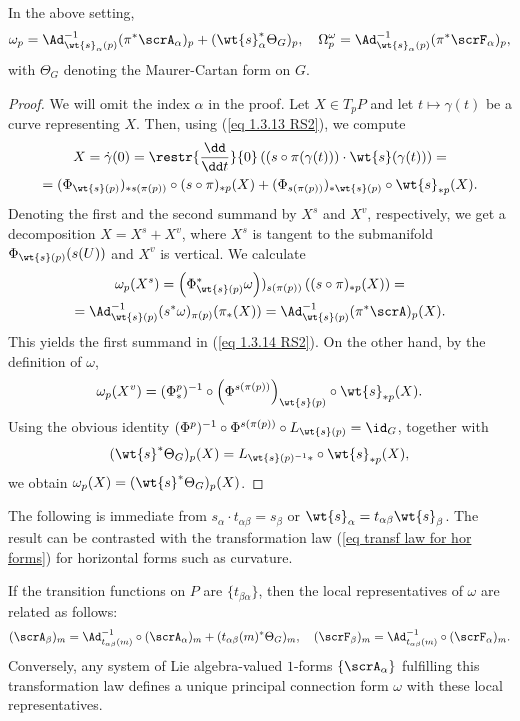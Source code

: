 \begin{prop}[{{\cite[Prop.~1.3.11]{RS2}}}]
    In the above setting, 
    \[\omega_p=\Ad_{\wt{s}_\alpha(p)}^{-1}(\pi^\ast\scrA_\alpha)_p+(\wt{s}_\alpha^\ast \Theta_G)_p,\quad \Omega^\omega_p=\Ad_{\wt{s}_\alpha(p)}^{-1}(\pi^\ast \scrF_\alpha)_p, \label{eq 1.3.14 RS2}\]
    with $\Theta_G$ denoting the Maurer-Cartan form on $G$.
\end{prop}
\begin{proof}
    We will omit the index $\alpha$ in the proof. Let $X\in T_pP$ and let $t\mapsto \gamma(t)$ be a curve representing $X$. Then, using (\ref{eq 1.3.13 RS2}), we compute
    \begin{multline}
        X=\dot\gamma(0)=\restr{\frac{\dd}{\dd t}}{0} \left((s\circ \pi(\gamma(t)))\cdot \wt{s}(\gamma(t))\right)=\\
        =(\Phi_{\wt{s}(p)})_{\ast s(\pi(p))}\circ (s\circ \pi)_{\ast p}(X)+(\Phi_{s(\pi(p))})_{\ast\wt{s}(p)}\circ \wt{s}_{\ast p}(X).
    \end{multline}
    Denoting the first and the second summand by $X^s$ and $X^v$, respectively, we get a decomposition $X=X^s+X^v$, where $X^s$ is tangent to the submanifold $\Phi_{\wt{s}(p)}(s(U))$ and $X^v$ is vertical. We calculate
    \begin{multline}
        \omega_p(X^s)=\left(\Phi_{\wt{s}(p)}^\ast\omega\right))_{s(\pi(p))}\left((s\circ\pi)_{\ast p}(X)\right)=\\
        =\Ad_{\wt{s}(p)}^{-1}(s^\ast \omega)_{\pi(p)}(\pi_\ast(X))=\Ad_{\wt{s}(p)}^{-1}(\pi^\ast\scrA)_p(X).
    \end{multline}
    This yields the first summand in (\ref{eq 1.3.14 RS2}). On the other hand, by the definition of $\omega$, 
    \[\omega_p(X^v)=(\Phi^p_{\ast})^{-1}\circ \left(\Phi^{s(\pi(p))}\right)_{\wt{s}(p)}\circ \wt{s}_{\ast p}(X).\]
    Using the obvious identity $(\Phi^p)^{-1}\circ \Phi^{s(\pi(p))}\circ L_{\wt{s}(p)}=\id_G$, together with
    \[(\wt{s}^\ast \Theta_G)_p(X)=L_{\wt{s}(p)^{-1}\ast }\circ\wt{s}_{\ast p}(X),\]
    we obtain $\omega_p(X)=(\wt{s}^\ast\Theta_G)_p(X)$.
\end{proof}
The following is immediate from $s_\alpha\cdot t_{\alpha\beta}=s_\beta$  or $\wt{s}_\alpha=t_{\alpha\beta}\wt{s}_\beta$. The result can be contrasted with the transformation law (\ref{eq transf law for hor forms}) for horizontal forms such as curvature.
\begin{cor}[{{\cite[Cor.~1.3.12]{RS2}}}]\label{cor 1.3.12 RS2}
    If the transition functions on $P$ are $\{t_{\beta\alpha}\}$, then the local representatives of $\omega$ are related as follows:
    \[(\scrA_\beta)_m=\Ad_{t_{\alpha\beta}(m)}^{-1}\circ (\scrA_\alpha)_m+(t_{\alpha\beta}(m)^\ast\Theta_G)_m,\quad (\scrF_\beta)_m=\Ad_{t_{\alpha\beta}(m)}^{-1}\circ (\scrF_\alpha)_m.\label{eq 1.3.15 RS2}\]
    Conversely, any system of Lie algebra-valued $1$-forms $\{\scrA_\alpha\}$ fulfilling this transformation law defines a unique principal connection form $\omega$ with these local representatives.
\end{cor}

